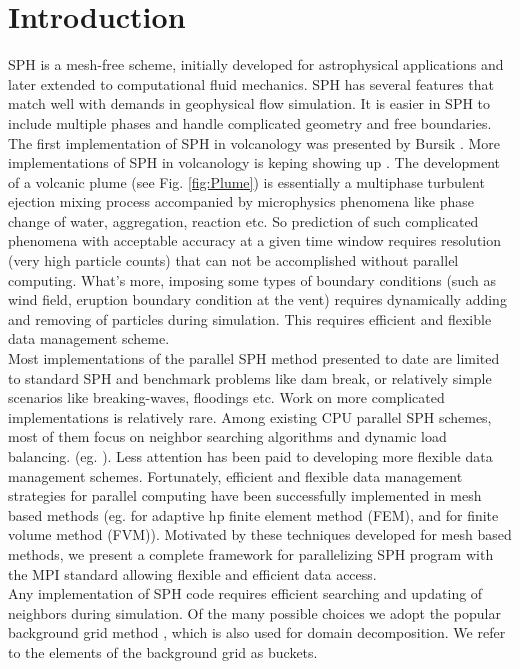 \documentclass[procedia]{easychair}
\begin{document}
\section{Introduction}
\label{sect:introduction}
SPH is a mesh-free scheme, initially developed for astrophysical applications and later extended to computational fluid mechanics. SPH has several features that match well with demands in geophysical flow simulation. It is easier in SPH to include multiple phases and handle complicated geometry and free boundaries. The first implementation of SPH in volcanology was presented by Bursik \cite{bursik2003smoothed}. More implementations of SPH in volcanology is keping showing up \cite{mcdougall2004model, haddad2016smoothed}. The development  of a volcanic plume (see Fig. \ref{fig:Plume}) is essentially a multiphase turbulent ejection mixing process accompanied by microphysics phenomena like phase change of water, aggregation, reaction etc. So prediction of such complicated phenomena with acceptable accuracy at a given time window requires resolution (very high particle counts) that can not be accomplished without parallel computing. What's more, imposing  some types of boundary conditions (such as wind field, eruption boundary condition at the vent) requires dynamically adding and removing of particles during simulation. This requires efficient and flexible data management scheme.\\
Most implementations of the parallel SPH method presented to date are limited to standard SPH and benchmark problems like dam break, or relatively
simple scenarios like breaking-waves, floodings etc. Work on more complicated implementations is relatively rare. Among existing CPU parallel SPH schemes, most of them focus on neighbor searching algorithms and dynamic load balancing. (eg. \cite{ferrari2009new, crespo2015dualsphysics}). Less attention has been paid to developing more flexible data management schemes. 
Fortunately, efficient and flexible data management strategies for parallel computing have been successfully implemented in mesh based methods (eg. \cite{laszloffy2000simple} for adaptive hp finite element method (FEM), and \cite{patra2005parallel} for finite volume method (FVM)). Motivated by these techniques developed for mesh based methods, we present a complete framework for parallelizing SPH program with the MPI standard allowing flexible and efficient data access.\\
Any implementation of SPH code requires efficient searching and updating of neighbors during simulation. Of the many possible choices we adopt the popular background grid method \cite{monaghan1985refined}, which is also used for domain decomposition. We refer to the elements of the background grid as buckets. 
\end{document}
